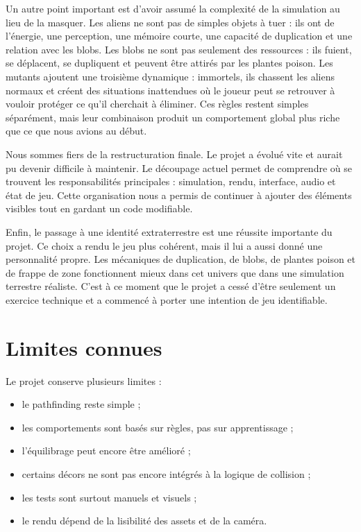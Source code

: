 ﻿\documentclass[11pt,a4paper]{article}
\begin{document}
Un autre point important est d'avoir assumé la complexité de la simulation au lieu de la masquer. Les aliens ne sont pas de simples objets à tuer : ils ont de l'énergie, une perception, une mémoire courte, une capacité de duplication et une relation avec les blobs. Les blobs ne sont pas seulement des ressources : ils fuient, se déplacent, se dupliquent et peuvent être attirés par les plantes poison. Les mutants ajoutent une troisième dynamique : immortels, ils chassent les aliens normaux et créent des situations inattendues où le joueur peut se retrouver à vouloir protéger ce qu'il cherchait à éliminer. Ces règles restent simples séparément, mais leur combinaison produit un comportement global plus riche que ce que nous avions au début.

Nous sommes fiers de la restructuration finale. Le projet a évolué vite et aurait pu devenir difficile à maintenir. Le découpage actuel permet de comprendre où se trouvent les responsabilités principales : simulation, rendu, interface, audio et état de jeu. Cette organisation nous a permis de continuer à ajouter des éléments visibles tout en gardant un code modifiable.

Enfin, le passage à une identité extraterrestre est une réussite importante du projet. Ce choix a rendu le jeu plus cohérent, mais il lui a aussi donné une personnalité propre. Les mécaniques de duplication, de blobs, de plantes poison et de frappe de zone fonctionnent mieux dans cet univers que dans une simulation terrestre réaliste. C'est à ce moment que le projet a cessé d'être seulement un exercice technique et a commencé à porter une intention de jeu identifiable.

\section{Limites connues}

Le projet conserve plusieurs limites :

\begin{itemize}[noitemsep]
  \item le pathfinding reste simple ;
  \item les comportements sont basés sur règles, pas sur apprentissage ;
  \item l'équilibrage peut encore être amélioré ;
  \item certains décors ne sont pas encore intégrés à la logique de collision ;
  \item les tests sont surtout manuels et visuels ;
  \item le rendu dépend de la lisibilité des assets et de la caméra.
\end{itemize}
\end{document}
